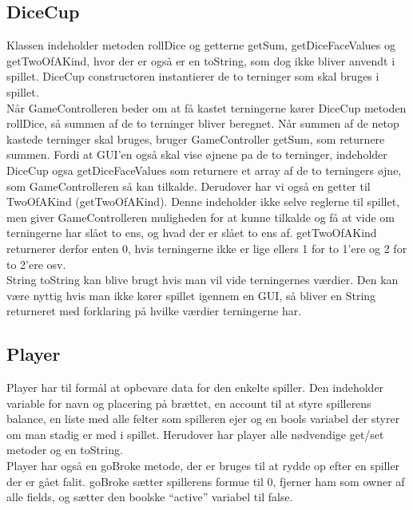 \subsection*{DiceCup}
Klassen indeholder metoden rollDice og getterne getSum, getDiceFaceValues og
getTwoOfAKind, hvor der er også er en toString, som dog ikke bliver anvendt i
spillet. DiceCup constructoren instantierer de to terninger som skal bruges i
spillet.\\
\indent Når GameControlleren beder om at få kastet terningerne kører DiceCup
metoden rollDice, så  summen af de to terninger bliver beregnet. Når summen af
de netop kastede terninger skal  bruges, bruger GameController getSum, som
returnere summen. Fordi at GUI’en også skal vise øjnene pa de to terninger,
indeholder DiceCup ogsa getDiceFaceValues som returnere et array af de to
terningers øjne, som GameControlleren så kan tilkalde. Derudover har vi også en
getter til TwoOfAKind (getTwoOfAKind). Denne indeholder ikke selve reglerne til
spillet, men giver GameControlleren muligheden for at kunne tilkalde og få at
vide om terningerne har slået to ens, og hvad der er slået to ens af.
getTwoOfAKind returnerer derfor enten 0, hvis  terningerne ikke er lige ellers
1 for to 1’ere og 2 for to 2’ere osv.\\
\indent String toString kan blive brugt hvis man vil vide terningernes værdier.
Den kan være nyttig hvis man ikke kører spillet igennem en GUI, så bliver en
String returneret med forklaring på hvilke værdier terningerne har.
\subsection*{Player}
Player har til formål at opbevare data for den enkelte spiller. Den indeholder
variable for navn og placering på brættet, en account til at styre spillerens
balance, en liste med alle felter som spilleren ejer og en bools variabel der
styrer om man stadig er med i spillet. Herudover har player alle nødvendige
get/set metoder og en toString.\\
\indent Player har også en goBroke metode, der er bruges til at rydde op efter
en spiller der er gået falit. goBroke sætter spillerens formue til 0, fjerner
ham som owner af alle fields, og sætter den boolske “active” variabel til false.
